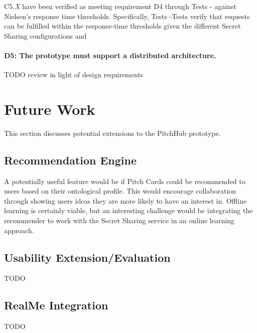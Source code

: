 C5.{\em X} have been verified as meeting requirement D4 through Tests - against Nielsen's response time thresholds. Specifically, Tests -Tests  verify that requests can be fulfilled within the response-time thresholds given the different Secret Sharing configurations and 



\paragraph{D5: The prototype must support a distributed architecture.}




TODO review in light of design requirements

\section{Future Work}

This section discusses potential extensions to the PitchHub prototype.

\subsection{Recommendation Engine}

A potentially useful feature would be if Pitch Cards could be recommended to users based on their ontological profile. This would encourage collaboration through showing users ideas they are more likely to have an interest in. Offline learning is certainly viable, but an interesting challenge would be integrating the recommender to work with the Secret Sharing service in an online learning approach.

\subsection{Usability Extension/Evaluation}

TODO

\subsection{RealMe Integration}

TODO
